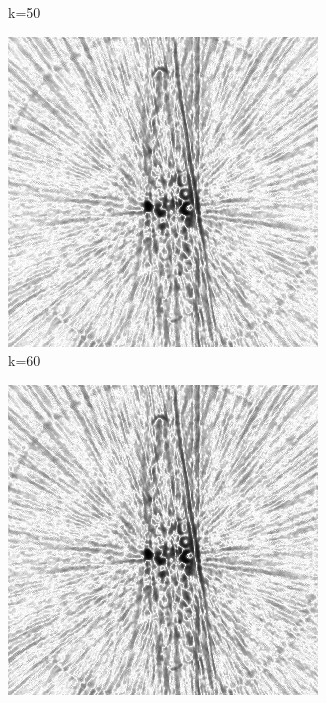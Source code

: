 \documentclass[journal]{IEEEtran}
\begin{document}
\begin{figure}[h]
\begin{subfigure}[b]{0.24\linewidth}
        \caption{k=50}
     \end{subfigure}
   \begin{subfigure}[b]{0.24\linewidth}
        \includegraphics[width=\textwidth]{../images/okra/post_TCI/2D/48_views/tuning_k/weightsIm_kk_60_lambda_prior_0.700000.png}
        \caption{k=60}
     \end{subfigure}
   \begin{subfigure}[b]{0.24\linewidth}
        \includegraphics[width=\textwidth]{../images/okra/post_TCI/2D/48_views/tuning_k/weightsIm_kk_70_lambda_prior_0.700000.png}

\end{subfigure}
\end{figure}
\end{document}
